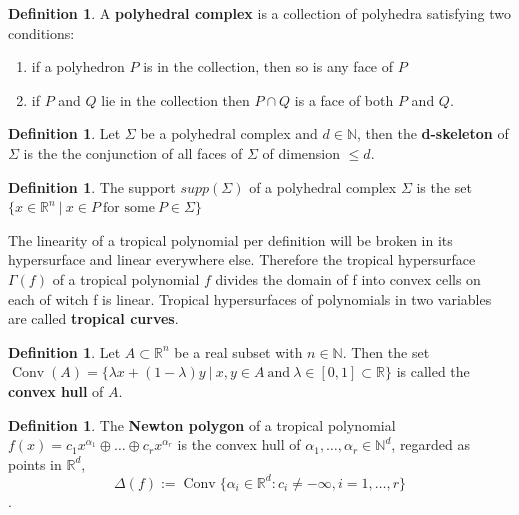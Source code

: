 \documentclass{article}
\theoremstyle{definition}
\newtheorem{definition}[theorem]{Definition}
\DeclareMathOperator{\Conv}{Conv}
\begin{document}
\begin{definition}\cite{maclagan2015introduction}
A \textbf{polyhedral complex} is a collection of polyhedra satisfying two conditions:
\begin{enumerate}[i]
\item if a polyhedron $P$ is in the collection, then so is any face of $P$
\item if $P$ and $Q$ lie in the collection then $P \cap Q$ is a face of both $P$ and $Q$.
\end{enumerate}
\end{definition}
\begin{definition}
Let $\Sigma$ be a polyhedral complex and $d \in \mathbb{N}$, then the \textbf{d-skeleton} of $\Sigma$ is the the conjunction of all faces of $\Sigma$ of dimension $\leq d$.
\end{definition}
\begin{definition}\cite{maclagan2015introduction}
The support $supp(\Sigma)$ of a polyhedral complex $\Sigma$ is the set $\{ x \in \mathbb{R}^{n} \ | \ x \in P \ \text{for some} \ P \in \Sigma \}$
\end{definition}


The linearity of a tropical polynomial per definition will be broken in its hypersurface and linear everywhere else. Therefore the tropical hypersurface $\Gamma(f)$ of a tropical polynomial $f$ divides the domain of f into convex cells on each of witch f is linear. Tropical hypersurfaces of polynomials in two variables are called \textbf{tropical curves}.\cite[p.~3]{zhang2018tropical}

\begin{definition}
Let $A \subset \mathbb{R}^{n}$ be a real subset with $n \in \mathbb{N}$. Then the set $\Conv(A) = \{\lambda x + (1- \lambda)y \ | \ x, y \in A \ \text{and} \ \lambda \in [0,1] \subset \mathbb{R}\}$ is called the \textbf{convex hull} of $A$.
\end{definition}

\begin{definition}\cite[p.~3]{zhang2018tropical}
The \textbf{Newton polygon} of a tropical polynomial $f(x) = c_1 x^{\alpha_1} \oplus \dots \oplus c_r x^{\alpha_r}$  is the convex hull of $\alpha_1 , \dots , \alpha_r \in \mathbb{N}^{d}$, regarded as points in $\mathbb{R}^{d}$,
$$ \Delta(f) := \Conv\{\alpha_i \in \mathbb{R}^{d} : c_i \neq -\infty , i = 1, \dots ,r \} $$.
\end{definition}
\end{document}
